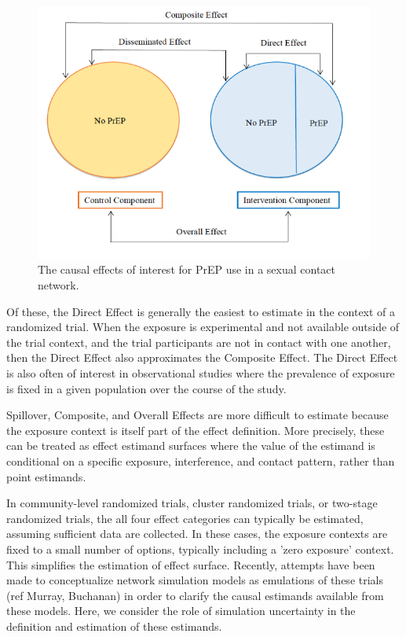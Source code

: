 \documentclass{article}
\theoremstyle{definition}
\begin{document}
\begin{figure}[H]
    \centering
    \includegraphics{Figures/figure1.png}
    \caption{The causal effects of interest for PrEP use in a sexual contact network.}
    \label{fig:1}
\end{figure}
Of these, the Direct Effect is generally the easiest to estimate in the context of a randomized trial. When the exposure is experimental and not available outside of the trial context, and the trial participants are not in contact with one another, then the Direct Effect also approximates the Composite Effect. The Direct Effect is also often of interest in observational studies where the prevalence of exposure is fixed in a given population over the course of the study.

Spillover, Composite, and Overall Effects are more difficult to estimate because the exposure context is itself part of the effect definition. More precisely, these can be treated as effect estimand surfaces where the value of the estimand is conditional on a specific exposure, interference, and contact pattern, rather than point estimands. 

In community-level randomized trials, cluster randomized trials, or two-stage randomized trials, the all four effect categories can typically be estimated, assuming sufficient data are collected. In these cases, the exposure contexts are fixed to a small number of options, typically including a 'zero exposure' context. This simplifies the estimation of effect surface. Recently, attempts have been made to conceptualize network simulation models as emulations of these trials (ref Murray, Buchanan) in order to clarify the causal estimands available from these models. Here, we consider the role of simulation uncertainty in the definition and estimation of these estimands.
\end{document}
